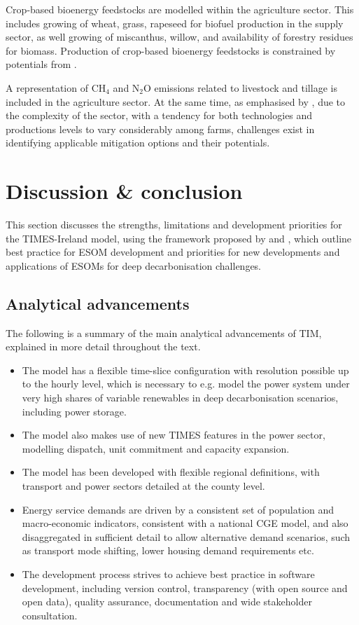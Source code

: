 \documentclass[gmd,manuscript]{copernicus}
\begin{document}
Crop-based bioenergy feedstocks are modelled within the agriculture sector. This includes growing of wheat, grass, rapeseed for biofuel production in the supply sector, as well growing of miscanthus, willow, and availability of forestry residues for biomass. Production of crop-based bioenergy feedstocks is constrained by potentials from \citet{SEAI2015}.

A representation of CH$_4$ and N$_2$O emissions related to livestock and tillage is included in the agriculture sector. At the same time, as emphasised by \citet{Chiodi2016}, due to the complexity of the sector, with a tendency for both technologies and productions levels to vary considerably among farms, challenges exist in identifying applicable mitigation options and their potentials.

\section{Discussion \& conclusion}
\label{s:discussion}
This section discusses the strengths, limitations and development priorities for the TIMES-Ireland model, using the framework proposed by \citet{Pye2020} and \citet{DeCarolis2017}, which outline best practice for ESOM development and priorities for new developments and applications of ESOMs for deep decarbonisation challenges.

\subsection{Analytical advancements}
The following is a summary of the main analytical advancements of TIM, explained in more detail throughout the text. 
\begin{itemize}
\item The model has a flexible time-slice configuration with resolution possible up to the hourly level, which is necessary to e.g. model the power system under very high shares of variable renewables in deep decarbonisation scenarios, including power storage. 
\item The model also makes use of new TIMES features in the power sector, modelling dispatch, unit commitment and capacity expansion.
\item The model has been developed with flexible regional definitions, with transport and power sectors detailed at the county level. 
\item Energy service demands are driven by a consistent set of population and macro-economic indicators, consistent with a national CGE model, and also disaggregated in sufficient detail to allow alternative demand scenarios, such as transport mode shifting, lower housing demand requirements etc.
\item The development process strives to achieve best practice in software development, including version control, transparency (with open source and open data), quality assurance, documentation and wide stakeholder consultation. 
\end{itemize}
\end{document}
